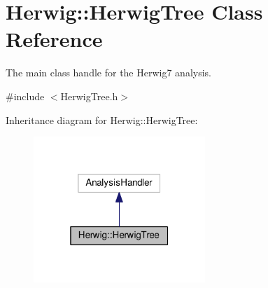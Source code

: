 \hypertarget{class_herwig_1_1_herwig_tree}{}\section{Herwig\+:\+:Herwig\+Tree Class Reference}
\label{class_herwig_1_1_herwig_tree}


The main class handle for the Herwig7 analysis.  




{\ttfamily \#include $<$Herwig\+Tree.\+h$>$}



Inheritance diagram for Herwig\+:\+:Herwig\+Tree\+:\nopagebreak
\begin{figure}[H]
\begin{center}
\leavevmode
\includegraphics[width=184pt]{class_herwig_1_1_herwig_tree__inherit__graph}
\end{center}
\end{figure}


